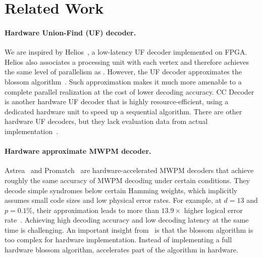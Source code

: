 \section{Related Work}\label{sec:related}

\paragraph{Hardware Union-Find (UF) decoder.} 
We are inspired by Helios~\cite{liyanage2023qce}, a low-latency UF decoder implemented on FPGA.
Helios also associates a processing unit with each vertex and therefore achieves the same level of parallelism as \arch.
However, the UF decoder approximates the blossom algorithm~\cite{wu2022interpretation}.
Such approximation makes it much more amenable to a complete parallel realization at the cost of lower decoding accuracy. 
CC Decoder~\cite{barber2023realtime} is another hardware UF decoder that is highly resource-efficient, using a dedicated hardware unit to speed up a sequential algorithm.
There are other hardware UF decoders, but they lack evaluation data from actual implementation~\cite{das2022afs}.

\paragraph{Hardware approximate MWPM decoder.}
Astrea~\cite{vittal2023astrea} and Promatch~\cite{alavisamani2024promatch} are hardware-accelerated MWPM decoders that achieve roughly the same accuracy of MWPM decoding under certain conditions.
They decode simple syndromes below certain Hamming weights, which implicitly assumes small code sizes and low physical error rates.
For example, at $d=13$ and $p=0.1\%$, their approximation leads to more than $13.9\times$ higher logical error rate~\cite{alavisamani2024promatch}.
Achieving high decoding accuracy and low decoding latency at the same time is challenging.
An important insight from~\cite{vittal2023astrea} is that the blossom algorithm is too complex for hardware implementation.
Instead of implementing a full hardware blossom algorithm, \system accelerates part of the algorithm in hardware.


